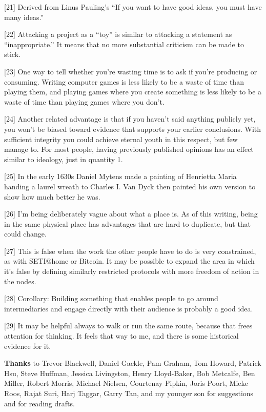 {[}21{]} Derived from Linus Pauling's ``If you want to have good ideas,
you must have many ideas.''

{[}22{]} Attacking a project as a ``toy'' is similar to attacking a
statement as ``inappropriate.'' It means that no more substantial
criticism can be made to stick.

{[}23{]} One way to tell whether you're wasting time is to ask if you're
producing or consuming. Writing computer games is less likely to be a
waste of time than playing them, and playing games where you create
something is less likely to be a waste of time than playing games where
you don't.

{[}24{]} Another related advantage is that if you haven't said anything
publicly yet, you won't be biased toward evidence that supports your
earlier conclusions. With sufficient integrity you could achieve eternal
youth in this respect, but few manage to. For most people, having
previously published opinions has an effect similar to ideology, just in
quantity 1.

{[}25{]} In the early 1630s Daniel Mytens made a painting of Henrietta
Maria handing a laurel wreath to Charles I. Van Dyck then painted his
own version to show how much better he was.

{[}26{]} I'm being deliberately vague about what a place is. As of this
writing, being in the same physical place has advantages that are hard
to duplicate, but that could change.

{[}27{]} This is false when the work the other people have to do is very
constrained, as with SETI@home or Bitcoin. It may be possible to expand
the area in which it's false by defining similarly restricted protocols
with more freedom of action in the nodes.

{[}28{]} Corollary: Building something that enables people to go around
intermediaries and engage directly with their audience is probably a
good idea.

{[}29{]} It may be helpful always to walk or run the same route, because
that frees attention for thinking. It feels that way to me, and there is
some historical evidence for it.

\textbf{Thanks} to Trevor Blackwell, Daniel Gackle, Pam Graham, Tom
Howard, Patrick Hsu, Steve Huffman, Jessica Livingston, Henry
Lloyd-Baker, Bob Metcalfe, Ben Miller, Robert Morris, Michael Nielsen,
Courtenay Pipkin, Joris Poort, Mieke Roos, Rajat Suri, Harj Taggar,
Garry Tan, and my younger son for suggestions and for reading drafts.
